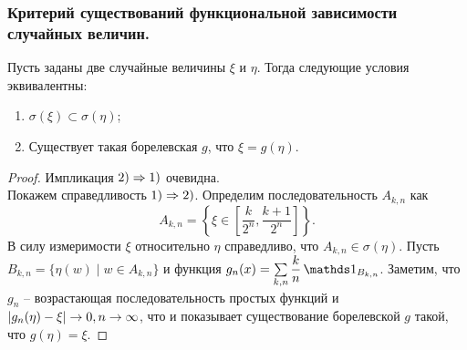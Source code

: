 \subsubsection{Критерий существований функциональной зависимости случайных величин.}
\begin{theorem}
    Пусть заданы две случайные величины $\xi$ и $\eta$.
    Тогда следующие условия эквивалентны:
    \begin{enumerate}
        \item $\sigma(\xi) \subset \sigma(\eta)$;
        \item Существует такая борелевская $g$, что $\xi = g(\eta)$.
    \end{enumerate}
\end{theorem}
\begin{proof}
    Импликация $2) \Rightarrow 1)$ очевидна. \\
    Покажем справедливость $1) \Rightarrow 2)$. 
    Определим последовательность $A_{k, n}$ как
    \[
        A_{k, n} = \left\{\xi \in \left[\dfrac{k}{2^n}, \dfrac{k + 1 }{2^{n}}\right]\right\}.
    \]
    В силу измеримости $\xi$ относительно $\eta$ справедливо, что $A_{k, n} \in \sigma(\eta)$.
    Пусть $B_{k, n} = \{\eta(w) \mid w \in A_{k, n}\}$ и функция $g_n(x) = \sum\limits_{k, n} \dfrac{k}{n}\Ind_{B_{k, n}}$. Заметим, что $g_n$ -- возрастающая последовательность простых функций и $|g_n(\eta) - \xi| \rightarrow 0, n \rightarrow \infty$, что и показывает существование борелевской $g$ такой, что $g(\eta) = \xi$.
\end{proof}